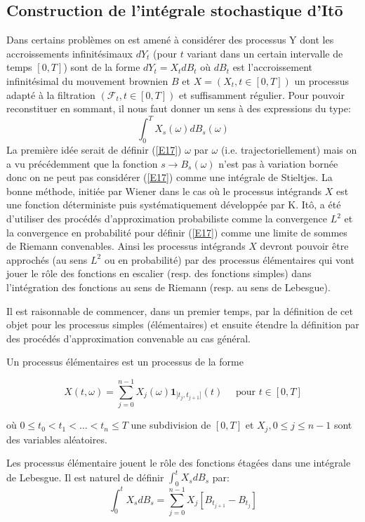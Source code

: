 \documentclass[A4paper,12pt]{report}
\begin{document}
\subsection{Construction de l’intégrale stochastique d'Itō}
Dans certains problèmes on est amené à considérer des processus Y dont les accroissements infinitésimaux $dY_t$ (pour $t$ variant dans un certain intervalle de temps $[0, T]$) sont de la forme $dY_t = X_t dB_t$ où $dB_t$ est l'accroissement infinitésimal du mouvement brownien $B$ et $X = (X_t, t\in [0, T])$ un processus adapté à la filtration $(\mathcal{F}_t, t \in [0, T])$ et suffisamment régulier. Pour pouvoir reconstituer en sommant, il nous faut donner un sens à des expressions du type: 
\begin{equation}\label{E17}
\int_0 ^T X_s (\omega) dB_s (\omega)
\end{equation}
La première idée serait de définir (\ref{E17}) $\omega$ par $\omega$ (i.e. trajectoriellement) mais on a vu précédemment que la fonction $s \longrightarrow B_s(\omega) $ n'est pas à variation bornée donc on ne peut pas considérer (\ref{E17}) comme une intégrale de Stieltjes. La bonne méthode, initiée par Wiener dans le cas où le processus intégrands $X$ est une fonction déterministe puis systématiquement développée par K. Itô, a été d'utiliser des procédés d'approximation probabiliste comme la convergence $L^2$ et la convergence en probabilité pour définir (\ref{E17}) comme une limite de sommes de Riemann convenables. Ainsi les processus intégrands $X$ devront pouvoir être approchés (au sens $L^2$ ou en probabilité) par des processus élémentaires qui vont jouer le rôle des fonctions en escalier (resp. des fonctions simples) dans l'intégration des fonctions au sens de Riemann (resp. au sens de Lebesgue).

Il est raisonnable de commencer, dans un premier temps, par la définition de cet objet pour les processus simples (élémentaires) et ensuite étendre la définition par des procédés d'approximation convenable au cas général.

Un processus élémentaires est un processus de la forme

$$
X(t, \omega)=\sum_{j=0}^{n-1} X_{j}(\omega) \mathbf{1}_{] t_{j}, t_{j+1}]}(t) \quad \text { pour } t \in[0, T]
$$

où $0 \leq t_{0}<t_{1}<\ldots<t_{n} \leq T$ une subdivision de $[0, T]$ et $X_{j}, 0 \leq j \leq n-1$ sont des variables aléatoires.

Les processus élémentaire jouent le rôle des fonctions étagées dans une intégrale de Lebesgue. Il est naturel de définir $\int_{0}^{t} X_s d B_{s}$ par:
\begin{equation}\label{E8}
\int_{0}^{t} X_s d B_{s}=\sum_{j=0}^{n-1} X_{j}\left[B_{t_{j+1}}-B_{t_{j}}\right]
\end{equation}
\end{document}
